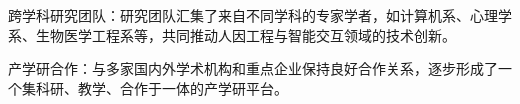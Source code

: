 跨学科研究团队：研究团队汇集了来自不同学科的专家学者，如计算机系、心理学系、生物医学工程系等，共同推动人因工程与智能交互领域的技术创新。

产学研合作：与多家国内外学术机构和重点企业保持良好合作关系，逐步形成了一个集科研、教学、合作于一体的产学研平台。
















